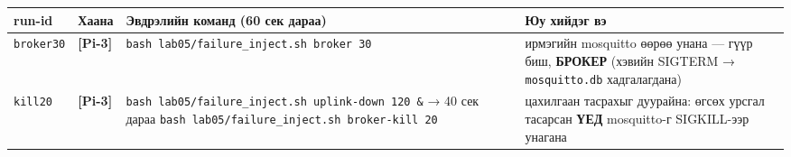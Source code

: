 \begingroup\scriptsize\begin{longtable}[]{@{}llll@{}}
\toprule
\begin{minipage}[b]{0.22\columnwidth}\raggedright
run-id\strut
\end{minipage} & \begin{minipage}[b]{0.22\columnwidth}\raggedright
Хаана\strut
\end{minipage} & \begin{minipage}[b]{0.22\columnwidth}\raggedright
Эвдрэлийн команд (60 сек дараа)\strut
\end{minipage} & \begin{minipage}[b]{0.22\columnwidth}\raggedright
Юу хийдэг вэ\strut
\end{minipage}\tabularnewline
\midrule
\endhead
\begin{minipage}[t]{0.22\columnwidth}\raggedright
\texttt{broker30}\strut
\end{minipage} & \begin{minipage}[t]{0.22\columnwidth}\raggedright
\textbf{{[}Pi-3{]}}\strut
\end{minipage} & \begin{minipage}[t]{0.22\columnwidth}\raggedright
\texttt{bash\ lab05/\allowbreak{}failure\_\allowbreak{}inject.\allowbreak{}sh\ broker\ 30}\strut
\end{minipage} & \begin{minipage}[t]{0.22\columnwidth}\raggedright
ирмэгийн mosquitto өөрөө унана --- гүүр биш, \textbf{БРОКЕР} (хэвийн SIGTERM → \texttt{mosquitto.db} хадгалагдана)\strut
\end{minipage}\tabularnewline
\begin{minipage}[t]{0.22\columnwidth}\raggedright
\texttt{kill20}\strut
\end{minipage} & \begin{minipage}[t]{0.22\columnwidth}\raggedright
\textbf{{[}Pi-3{]}}\strut
\end{minipage} & \begin{minipage}[t]{0.22\columnwidth}\raggedright
\texttt{bash\ lab05/\allowbreak{}failure\_\allowbreak{}inject.\allowbreak{}sh\ uplink-down\ 120\ \&\allowbreak{}} → 40 сек дараа \texttt{bash\ lab05/\allowbreak{}failure\_\allowbreak{}inject.\allowbreak{}sh\ broker-kill\ 20}\strut
\end{minipage} & \begin{minipage}[t]{0.22\columnwidth}\raggedright
цахилгаан тасрахыг дуурайна: өгсөх урсгал тасарсан \textbf{ҮЕД} mosquitto-г SIGKILL-ээр унагана\strut
\end{minipage}\tabularnewline

\end{longtable}
